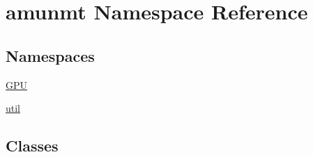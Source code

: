\hypertarget{namespaceamunmt}{}\section{amunmt Namespace Reference}
\label{namespaceamunmt}
\subsection*{Namespaces}
\begin{DoxyCompactItemize}
\item 
 \hyperlink{namespaceamunmt_1_1GPU}{G\+PU}
\item 
 \hyperlink{namespaceamunmt_1_1util}{util}
\end{DoxyCompactItemize}
\subsection*{Classes}

